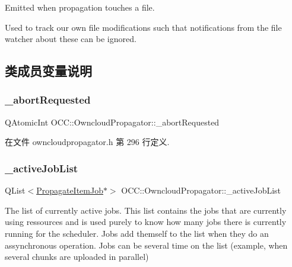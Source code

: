Emitted when propagation touches a file.

Used to track our own file modifications such that notifications from the file watcher about these can be ignored. 

\subsection{类成员变量说明}
\mbox{\label{class_o_c_c_1_1_owncloud_propagator_a492f3a3d5faea06844955209aa0a70c1}} 
\subsubsection{\texorpdfstring{\+\_\+abort\+Requested}{\_abortRequested}}
{\footnotesize\ttfamily Q\+Atomic\+Int O\+C\+C\+::\+Owncloud\+Propagator\+::\+\_\+abort\+Requested}



在文件 owncloudpropagator.\+h 第 296 行定义.

\mbox{\label{class_o_c_c_1_1_owncloud_propagator_a5f04bef49c8ac2fb7b4f2fddbc022219}} 
\subsubsection{\texorpdfstring{\+\_\+active\+Job\+List}{\_activeJobList}}
{\footnotesize\ttfamily Q\+List$<$\hyperlink{class_o_c_c_1_1_propagate_item_job}{Propagate\+Item\+Job}$\ast$$>$ O\+C\+C\+::\+Owncloud\+Propagator\+::\+\_\+active\+Job\+List}

The list of currently active jobs. This list contains the jobs that are currently using ressources and is used purely to know how many jobs there is currently running for the scheduler. Jobs add themself to the list when they do an assynchronous operation. Jobs can be several time on the list (example, when several chunks are uploaded in parallel) 

